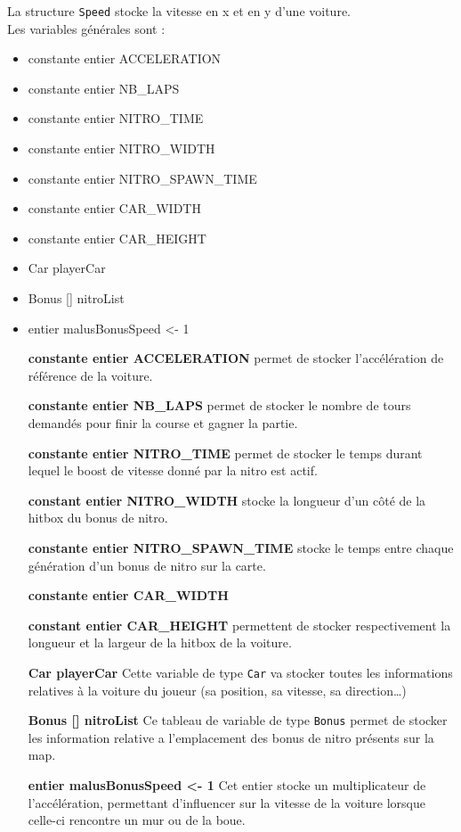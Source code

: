 \documentclass[11pt, final]{report}
\renewcommand{\tt}[1]{\texttt{#1}}
\begin{document}
La structure \tt{Speed} stocke la vitesse en x et en y d'une voiture.
\\

Les variables générales sont : 

\begin{itemize}
\item constante entier ACCELERATION
\item constante entier NB\_LAPS
\item constante entier NITRO\_TIME
\item constante entier NITRO\_WIDTH
\item constante entier NITRO\_SPAWN\_TIME
\item constante entier CAR\_WIDTH
\item constante entier CAR\_HEIGHT
\item Car playerCar
\item Bonus [] nitroList
\item entier malusBonusSpeed <- 1
\\
\end{itemize}

\begin{itemize}
  \item [\textbf{constante entier ACCELERATION}]permet de stocker l'accélération de référence de la voiture.
  \item [\textbf{constante entier NB\_LAPS}]permet de stocker le nombre de tours demandés pour finir la course et gagner la partie.
  \item[\textbf{constante entier NITRO\_TIME}]permet de stocker le temps durant lequel le boost de vitesse donné par la nitro est actif.
  \item[\textbf{constant entier NITRO\_WIDTH}]stocke la longueur d'un côté de la hitbox du bonus de nitro.
  \item[\textbf{constante entier NITRO\_SPAWN\_TIME}]stocke le temps entre chaque génération d'un bonus de nitro sur la carte.
  \item[\textbf{constante entier CAR\_WIDTH}]
  \item[\textbf{constant entier CAR\_HEIGHT}]permettent de stocker respectivement la longueur et la largeur de la hitbox de la voiture.
  \item[\textbf{Car playerCar}]Cette variable de type \tt{Car} va stocker toutes les informations relatives à la voiture du joueur (sa position, sa vitesse, sa direction\ldots)
  \item[\textbf{Bonus [] nitroList}]Ce tableau de variable de type \tt{Bonus} permet de stocker les information relative a l'emplacement des bonus de nitro présents sur la map.
  \item[\textbf{entier malusBonusSpeed <- 1}]Cet entier stocke un multiplicateur de l'accélération, permettant d'influencer sur la vitesse de la voiture lorsque celle-ci rencontre un mur ou de la boue.
\end{itemize}
\end{document}
